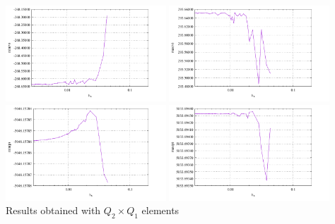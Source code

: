 \begin{center}
\includegraphics[width=6cm]{python_codes/fieldstone_25/results/min_v_100.pdf}
\includegraphics[width=6cm]{python_codes/fieldstone_25/results/max_v_100.pdf}\\
\includegraphics[width=6cm]{python_codes/fieldstone_25/results/min_p_100.pdf}
\includegraphics[width=6cm]{python_codes/fieldstone_25/results/max_p_100.pdf}\\
{\captionfont Results obtained with $Q_2\times Q_1$ elements} 
\end{center}


